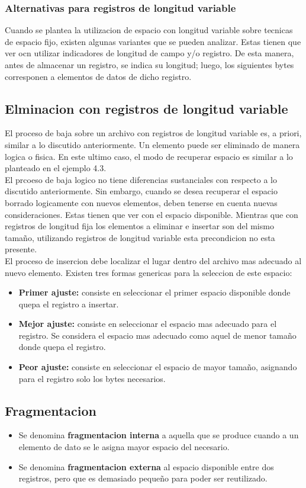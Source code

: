 \subsubsection{Alternativas para registros de longitud variable}
Cuando se plantea la utilizacion de espacio con longitud variable sobre tecnicas de espacio fijo, existen algunas variantes que se pueden analizar. Estas tienen que ver ocn utilizar indicadores de longitud de campo y/o registro. De esta manera, antes de almacenar un registro, se indica su longitud; luego, los siguientes bytes corresponen a elementos de datos de dicho registro.

\subsection{Elminacion con registros de longitud variable}
El proceso de baja sobre un archivo con registros de longitud variable es, a priori, similar a lo discutido anteriormente. Un elemento puede ser eliminado de manera logica o fisica. En este ultimo caso, el modo de recuperar espacio es similar a lo planteado en el ejemplo 4.3. \\
El prcoeso de baja logico no tiene diferencias sustanciales con respecto a lo discutido anteriormente. Sin embargo, cuando se desea recuperar el espacio borrado logicamente con nuevos elementos, deben tenerse en cuenta nuevas consideraciones. Estas tienen que ver con el espacio disponible. Mientras que con registros de longitud fija los elementos a eliminar e insertar son del mismo tamaño, utilizando registros de longitud variable esta precondicion no esta presente.\\
El proceso de insercion debe localizar el lugar dentro del archivo mas adecuado al nuevo elemento. Existen tres formas genericas para la seleccion de este espacio:
\begin{itemize}
  \item \textbf{Primer ajuste: }consiste en seleccionar el primer espacio disponible donde quepa el registro a insertar.
  \item \textbf{Mejor ajuste: }consiste en seleccionar el espacio mas adecuado para el registro. Se considera el espacio mas adecuado como aquel de menor tamaño donde quepa el registro.
  \item \textbf{Peor ajuste: }consiste en seleccionar el espacio de mayor tamaño, asignando para el registro solo los bytes necesarios.
\end{itemize}

\subsection{Fragmentacion}
\begin{itemize}
  \item Se denomina \textbf{fragmentacion interna} a aquella que se produce cuando a un elemento de dato se le asigna mayor espacio del necesario.
  \item Se denomina \textbf{fragmentacion externa} al espacio disponible entre dos registros, pero que es demasiado pequeño para poder ser reutilizado.
\end{itemize}


